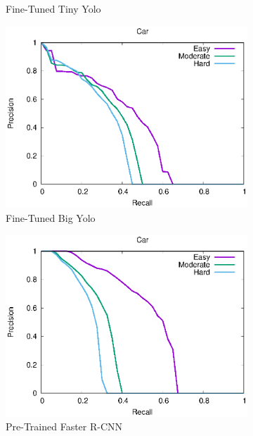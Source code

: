\begin{figure}[h!]
\begin{subfigure}[t]{.32\textwidth}
    \caption{Fine-Tuned Tiny Yolo}
\end{subfigure}%
\begin{subfigure}[t]{.32\textwidth}
    \centering
    \includegraphics[width=1.0\linewidth]{img/yolo_Dec_7_big/plot_valid_30/car_detection.eps}
    \caption{Fine-Tuned Big Yolo}
\end{subfigure}
\begin{subfigure}[t]{.32\textwidth}
    \centering
    \includegraphics[width=1.0\linewidth]{img/FRCNN_Nov_8/plot_valid_30/car_detection.eps}
    \caption{Pre-Trained Faster R-CNN}
\end{subfigure}%
\begin{subfigure}[t]{.32\textwidth}
    \centering

\end{subfigure}
\end{figure}
